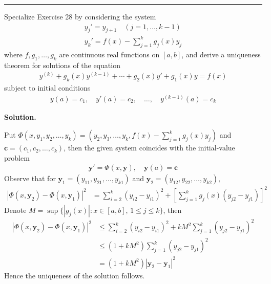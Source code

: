 \documentclass[12pt]{article}
\theoremstyle{definition}
\begin{document}
\bigskip\noindent\hrule\bigskip

Specialize Exercise 28 by considering the system
\begin{align*}
y_j'=y_{j+1}\quad(j=1,\ldots,k-1)\\
y_k'=f(x)-\sum_{j=1}^kg_j(x)y_j
\end{align*}
where $f,g_1,\ldots,g_k$ are continuous real functions on $[a,b]$, and derive a uniqueness theorem for solutions of the equation
\begin{align*}
y^{(k)}+g_k(x)y^{(k-1)}+\cdots+g_2(x)y'+g_1(x)y=f(x)
\end{align*}
subject to initial conditions
\begin{align*}
y(a)=c_1,\quad
y'(a)=c_2,\quad
\ldots,\quad
y^{(k-1)}(a)=c_k
\end{align*}

\smallskip
\noindent\textbf{Solution.}\quad

Put $\Phi(x,y_1,y_2,\ldots,y_k)=\left(y_2,y_3,\ldots,y_k,f(x)-\sum_{j=1}^kg_j(x)y_j\right)$ and $\mathbf{c}=(c_1,c_2,\ldots,c_k)$, then the given system coincides with the initial-value problem
\begin{align*}
\mathbf{y}'=\Phi(x,\mathbf{y}),\quad\mathbf{y}(a)=\mathbf{c}
\end{align*}
Observe that for $\mathbf{y}_1=(y_{11},y_{21},\ldots,y_{k1})$ and $\mathbf{y}_2=(y_{12},y_{22},\ldots,y_{k2})$,
\begin{align*}
\left\vert\Phi(x,\mathbf{y}_2)-\Phi(x,\mathbf{y}_1)\right\vert^2
&=\sum_{i=2}^k(y_{i2}-y_{i1})^2+\left[\sum_{j=1}^kg_j(x)(y_{j2}-y_{j1})\right]^2
\end{align*}
Denote $M=\sup\{\left\vert g_j(x)\right\vert:x\in[a,b],\,1\le j\le k\}$, then
\begin{align*}
\left\vert\Phi(x,\mathbf{y}_2)-\Phi(x,\mathbf{y}_1)\right\vert^2
&\le\sum_{i=2}^k\left(y_{i2}-y_{i1}\right)^2+kM^2\sum_{j=1}^k\left(y_{j2}-y_{j1}\right)^2 \\
&\le\left(1+kM^2\right)\sum_{j=1}^k\left(y_{j2}-y_{j1}\right)^2 \\
&=\left(1+kM^2\right)\left\vert\mathbf{y}_2-\mathbf{y}_1\right\vert^2
\end{align*}
Hence the uniqueness of the solution follows.
\end{document}
